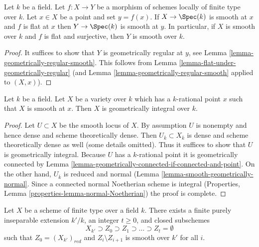 \begin{lemma}
\label{lemma-flat-under-smooth}
Let $k$ be a field. Let $f : X \to Y$ be a morphism of schemes locally
of finite type over $k$. Let $x \in X$ be a point and set $y = f(x)$.
If $X \to \Spec(k)$ is smooth at $x$ and $f$ is flat at $x$
then $Y \to \Spec(k)$ is smooth at $y$. In particular, if $X$ is
smooth over $k$ and $f$ is flat and surjective, then $Y$ is smooth over $k$.
\end{lemma}

\begin{proof}
It suffices to show that $Y$ is geometrically regular at $y$, see
Lemma \ref{lemma-geometrically-regular-smooth}.
This follows from
Lemma \ref{lemma-flat-under-geometrically-regular}
(and
Lemma \ref{lemma-geometrically-regular-smooth}
applied to $(X, x)$).
\end{proof}

\begin{lemma}
\label{lemma-variety-with-smooth-rational-point}
Let $k$ be a field. Let $X$ be a variety over $k$ which has
a $k$-rational point $x$ such that $X$ is smooth at $x$.
Then $X$ is geometrically integral over $k$.
\end{lemma}

\begin{proof}
Let $U \subset X$ be the smooth locus of $X$. By assumption $U$ is nonempty
and hence dense and scheme theoretically dense. Then
$U_{\overline{k}} \subset X_{\overline{k}}$ is dense and
scheme theoretically dense as well (some details omitted).
Thus it suffices to show that $U$ is geometrically integral.
Because $U$ has a $k$-rational point it is geometrically connected
by Lemma \ref{lemma-geometrically-connected-if-connected-and-point}.
On the other hand, $U_{\overline{k}}$ is reduced and normal
(Lemma \ref{lemma-smooth-geometrically-normal}.
Since a connected normal Noetherian scheme
is integral (Properties, Lemma \ref{properties-lemma-normal-Noetherian})
the proof is complete.
\end{proof}

\begin{lemma}
\label{lemma-smooth-stratification}
Let $X$ be a scheme of finite type over a field $k$.
There exists a finite purely inseparable extension $k'/k$,
an integer $t \geq 0$, and closed subschemes
$$
X_{k'} \supset Z_0 \supset Z_1 \supset \ldots \supset Z_t = \emptyset
$$
such that $Z_0 = (X_{k'})_{red}$ and $Z_i \setminus Z_{i + 1}$
is smooth over $k'$ for all $i$.
\end{lemma}

